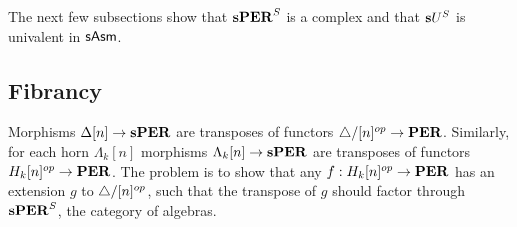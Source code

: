 \documentclass{amsart}
\theoremstyle{plain}
\newtheorem{theorem}{Theorem}
\theoremstyle{definition}
\newtheorem{defin}[theorem]{Definition}
\newcommand\hide[1]{}
\newcommand\cat\mathcal
\begin{document}
\hide{
Though we can't show that $\sAsm$ is a model category with these collections of maps, we can say something about the structure of the category of complexes.

\begin{defin}[Category of fibrant objects] A \emph{category of fibrant objects} is a category $\cat C$ together with two classes of morphisms: the class $F$ of fibrations and the class $W$ of \emph{weak equivalences}. These have the following properties.
\begin{enumerate}
\item If $f\circ g= h$ and two out of $f$, $g$ and $h$ are weak equivalences, then so is the third.
\item Isomorphisms are fibrations and fibrations are closed under composition.
\item Pullback of fibrations exists and are fibrations. Pullbacks of fibrations which are equivalences, are also equivalences.
\item The diagonal $X\to X\times X$ or each object $X$ factors as a fibration $X' \to X\times X$ following a weak equivalence $X\to X'$.
\item The map $\bang_X:X\to 1$ is a fibration for each object $X$.
\end{enumerate}
\end{defin}


\begin{theorem} The full subcategory $\sAsm_f$ of Kan complexes in $\sAsm$, together with homotopy equivalences and fibrations is a category of fibrant objects. \label{Hmtp} \end{theorem}

\begin{proof} The pushout product lemma applies to horn and cycle inclusions \cite{Hovey99}. This means that $X^{\Delta[1]}$ is a complex of $X$ is one and this defines the factorization of the diagonal. The rest is straightforward. \end{proof}
}

The next few subsections show that $\mathbf{s}\mathbf{PER}^S$ is a complex and that $\mathbf{s} U^S$ is univalent in $\sAsm$.

\subsection{Fibrancy}
Morphisms $\Delta[n] \to \mathbf{s}\mathbf{PER}$ are transposes of functors ${\mathord{\triangle}}/[n]^{op} \to \mathbf{PER}$. Similarly, for each horn $\Lambda_k[n]$ morphisms $\Lambda_k[n] \to \mathbf{s}\mathbf{PER}$ are transposes of functors $H_k[n]^{op} \to \mathbf{PER}$. 
The problem is to show that any $f:H_k[n]^{op} \to \mathbf{PER}$ has an extension $g$ to ${\mathord{\triangle}}/[n]^{op}$, such that the transpose of $g$ should factor through $\mathbf{s}\mathbf{PER}^S$, the category of algebras.
\end{document}
